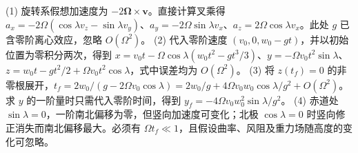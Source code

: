 (1) 旋转系假想加速度为 \(-2\boldsymbol\Omega\times\mathbf v\)。直接计算叉乘得 \(a_x=-2\Omega(\cos\lambda v_z-\sin\lambda v_y)\)、\(a_y=-2\Omega\sin\lambda v_x\)、\(a_z=2\Omega\cos\lambda v_x\)。此处 \(g\) 已含零阶离心效应，忽略 \(O(\Omega^2)\)。
(2) 代入零阶速度 \((v_0,0,w_0-gt)\)，并以初始位置为零积分两次，得到 \(x=v_0t-\Omega\cos\lambda(w_0t^2-gt^3/3)\)、\(y=-\Omega v_0t^2\sin\lambda\)、\(z=w_0t-gt^2/2+\Omega v_0t^2\cos\lambda\)，式中误差均为 \(O(\Omega^2)\)。
(3) 将 \(z(t_f)=0\) 的非零根展开，\(t_f=2w_0/(g-2\Omega v_0\cos\lambda)=2w_0/g+4\Omega v_0w_0\cos\lambda/g^2+O(\Omega^2)\)。求 \(y\) 的一阶量时只需代入零阶时间，得到 \(y_f=-4\Omega v_0w_0^2\sin\lambda/g^2\)。
(4) 赤道处 \(\sin\lambda=0\)，一阶南北偏移为零，但竖向加速度可变化；北极 \(\cos\lambda=0\) 时竖向修正消失而南北偏移最大。必须有 \(\Omega t_f\ll1\)，且假设曲率、风阻及重力场随高度的变化可忽略。

